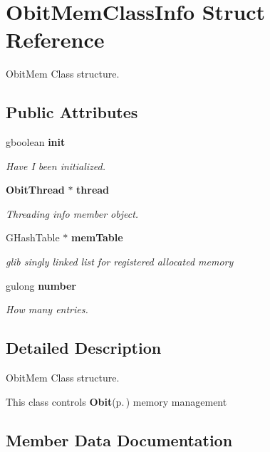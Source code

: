 \section{Obit\-Mem\-Class\-Info Struct Reference}
\label{structObitMemClassInfo}
Obit\-Mem Class structure.  


\subsection*{Public Attributes}
\begin{CompactItemize}
\item 
gboolean {\bf init}
\begin{CompactList}\small\item\em Have I been initialized. \item\end{CompactList}\item 
{\bf Obit\-Thread} $\ast$ {\bf thread}
\begin{CompactList}\small\item\em Threading info member object. \item\end{CompactList}\item 
GHash\-Table $\ast$ {\bf mem\-Table}
\begin{CompactList}\small\item\em glib singly linked list for registered allocated memory \item\end{CompactList}\item 
gulong {\bf number}
\begin{CompactList}\small\item\em How many entries. \item\end{CompactList}\end{CompactItemize}


\subsection{Detailed Description}
Obit\-Mem Class structure. 

This class controls {\bf Obit}{\rm (p.\,\pageref{structObit})} memory management 



\subsection{Member Data Documentation}
